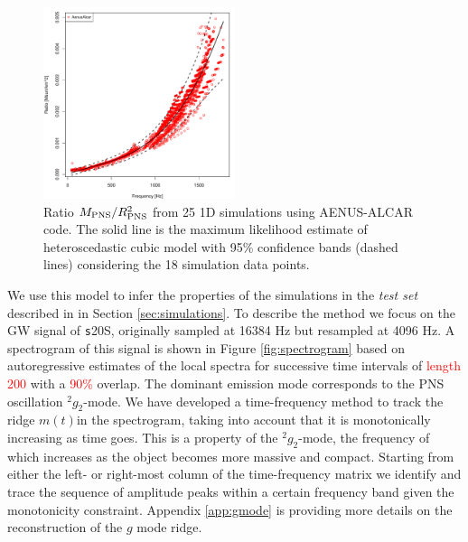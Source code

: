 \begin{figure}
 \centering
 \includegraphics[width=0.5\textwidth]{plots/model}
 \caption{Ratio $M_{\rm PNS}/R_{\rm PNS}^2$ from 25 1D simulations using {\sc AENUS-ALCAR} code. The solid line is the maximum likelihood estimate of heteroscedastic cubic model with 95\% confidence bands (dashed lines) considering the 18 simulation data points. } \label{fig:LMVAR}

\end{figure}

{We use this model to infer the properties of the simulations in the 
{\it test set} described in in Section \ref{sec:simulations}.}
To describe the method we focus on the GW signal
of {\texttt s20S}, originally
sampled at 16384 Hz but resampled at 4096 Hz.
A spectrogram of this signal is shown in Figure \ref{fig:spectrogram} based on
autoregressive estimates of the local spectra for successive time intervals of 
\textcolor{red}{length 200} with a \textcolor{red}{ 90\%} overlap.
The dominant emission mode corresponds to the PNS oscillation $\mbox{}^2 g_2$-mode. We have
developed a time-frequency method to track the ridge $m(t) $in the spectrogram,
taking into account that it is monotonically increasing as time goes. 
{This is a property of the $\mbox{}^2 g_2$-mode, the frequency of which  
increases as the object becomes more massive and compact}.
Starting from either the left- or right-most column of the time-frequency matrix
we identify and trace the sequence of amplitude peaks within a certain frequency
band given the monotonicity constraint. Appendix \ref{app:gmode} is providing more
details on the reconstruction of the $g$ mode ridge. 



